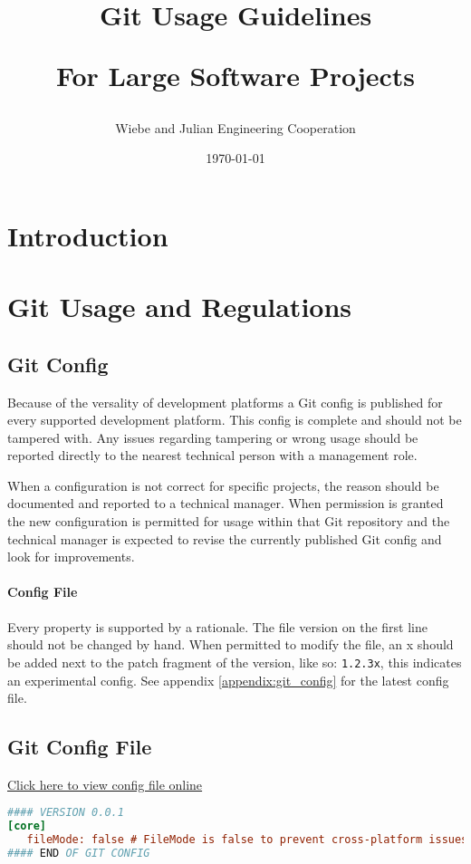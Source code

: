 \documentclass[12pt]{article}
\title{
      Git Usage Guidelines \\
      \begin{large}
         For Large Software Projects
      \end{large}
}
\date{\today}
\author{Wiebe and Julian Engineering Cooperation}
\begin{document}
\maketitle

\newpage
{} %
\tableofcontents
\newpage
{} %

\newpage
\section{Introduction}


\pagebreak
\section{Git Usage and Regulations}
\subsection{Git Config}
Because of the versality of development platforms a Git config is published for
every supported development platform. This config is complete and should not be
tampered with. Any issues regarding tampering or wrong usage should be reported
directly to the nearest technical person with a management role.

When a configuration is not correct for specific projects, the reason should be
documented and reported to a technical manager. When permission is granted the
new configuration is permitted for usage within that Git repository and the
technical manager is expected to revise the currently published Git config and
look for improvements.

\paragraph{Config File}
Every property is supported by a rationale. The file version on the first line
should not be changed by hand. When permitted to modify the file, an x should be
added next to the patch fragment of the version, like so: \lstinline{1.2.3x},
this indicates an experimental config. See appendix \ref{appendix:git_config}
for the latest config file.

\printbibliography

\newpage
\begin{appendix}
   \fancyfoot{} %

   \section{Git Config File}
   \href{https://example.com}{Click here to view config file online}

   \label{appendix:git_config}
   \begin{lstlisting}[language=Ini]
#### VERSION 0.0.1
[core]
   fileMode: false # FileMode is false to prevent cross-platform issues
#### END OF GIT CONFIG
   \end{lstlisting}
\end{appendix}
\end{document}
